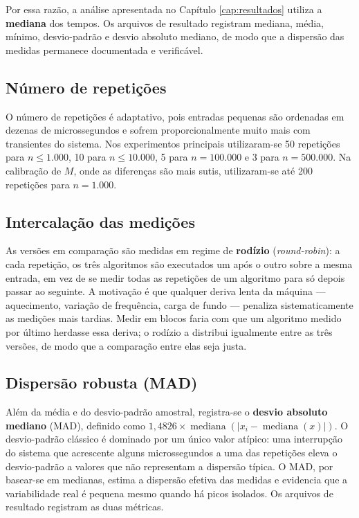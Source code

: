 Por essa razão, a análise apresentada no Capítulo \ref{cap:resultados} utiliza a
\textbf{mediana} dos tempos. Os arquivos de resultado registram mediana, média,
mínimo, desvio-padrão e desvio absoluto mediano, de modo que a dispersão das medidas
permanece documentada e verificável.

\subsection{Número de repetições}

O número de repetições é adaptativo, pois entradas pequenas são ordenadas em dezenas
de microssegundos e sofrem proporcionalmente muito mais com transientes do sistema.
Nos experimentos principais utilizaram-se 50 repetições para $n \leq 1.000$, 10 para
$n \leq 10.000$, 5 para $n = 100.000$ e 3 para $n = 500.000$. Na calibração de $M$,
onde as diferenças são mais sutis, utilizaram-se até 200 repetições para $n = 1.000$.

\subsection{Intercalação das medições}

As versões em comparação são medidas em regime de \textbf{rodízio}
(\textit{round-robin}): a cada repetição, os três algoritmos são executados um após o
outro sobre a mesma entrada, em vez de se medir todas as repetições de um algoritmo
para só depois passar ao seguinte. A motivação é que qualquer deriva lenta da máquina
--- aquecimento, variação de frequência, carga de fundo --- penaliza
sistematicamente as medições mais tardias. Medir em blocos faria com que um algoritmo
medido por último herdasse essa deriva; o rodízio a distribui igualmente entre as três
versões, de modo que a comparação entre elas seja justa.

\subsection{Dispersão robusta (MAD)}

Além da média e do desvio-padrão amostral, registra-se o \textbf{desvio absoluto
mediano} (MAD), definido como $1{,}4826 \times \operatorname{mediana}(|x_i -
\operatorname{mediana}(x)|)$. O desvio-padrão clássico é dominado por um único valor
atípico: uma interrupção do sistema que acrescente alguns microssegundos a uma das
repetições eleva o desvio-padrão a valores que não representam a dispersão típica. O
MAD, por basear-se em medianas, estima a dispersão efetiva das medidas e evidencia
que a variabilidade real é pequena mesmo quando há picos isolados. Os arquivos de
resultado registram as duas métricas.

